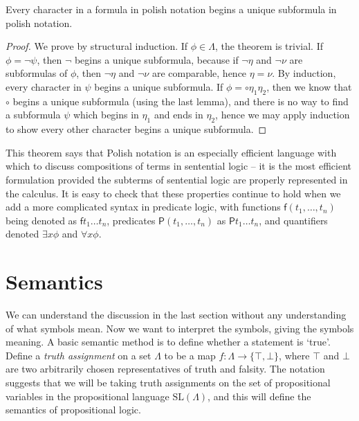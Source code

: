 \begin{theorem}
    Every character in a formula in polish notation begins a unique subformula in polish notation.
\end{theorem}
\begin{proof}
    We prove by structural induction. If $\phi \in \Lambda$, the theorem is trivial. If $\phi = \neg \psi$, then $\neg$ begins a unique subformula, because if $\neg \eta$ and $\neg \nu$ are subformulas of $\phi$, then $\neg \eta$ and $\neg \nu$ are comparable, hence $\eta = \nu$. By induction, every character in $\psi$ begins a unique subformula. If $\phi = \circ \eta_1 \eta_2$, then we know that $\circ$ begins a unique subformula (using the last lemma), and there is no way to find a subformula $\psi$ which begins in $\eta_1$ and ends in $\eta_2$, hence we may apply induction to show every other character begins a unique subformula.
\end{proof}

This theorem says that Polish notation is an especially efficient language with which to discuss compositions of terms in sentential logic -- it is the most efficient formulation provided the subterms of sentential logic are properly represented in the calculus. It is easy to check that these properties continue to hold when we add a more complicated syntax in predicate logic, with functions $\mathsf{f}(t_1, \dots, t_n)$ being denoted as $\mathsf{f} t_1 \dots t_n$, predicates $\mathsf{P}(t_1, \dots, t_n)$ as $\mathsf{P} t_1 \dots t_n$, and quantifiers denoted $\exists x \phi$ and $\forall x \phi$.

\section{Semantics}

We can understand the discussion in the last section without any understanding of what symbols mean. Now we want to interpret the symbols, giving the symbols meaning. A basic semantic method is to define whether a statement is `true'. Define a \emph{truth assignment} on a set $\Lambda$ to be a map $f: \Lambda \to \{ \top, \bot \}$, where $\top$ and $\bot$ are two arbitrarily chosen representatives of truth and falsity. The notation suggests that we will be taking truth assignments on the set of propositional variables in the propositional language $\text{SL}(\Lambda)$, and this will define the semantics of propositional logic.

